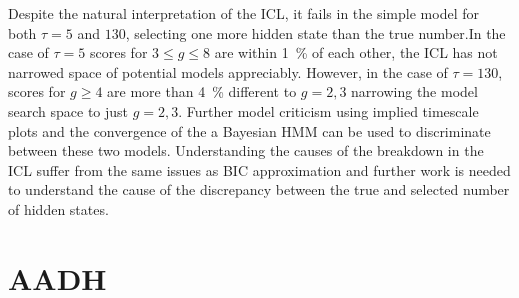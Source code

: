 Despite the natural interpretation of the ICL, it fails in the simple model for both $\tau=5$ and $130$, selecting one more hidden state than the true number.In the case of $\tau=5$  scores for $3\le g \le 8$ are within \SI{1}{\percent} of each other, the ICL has not narrowed space of potential models appreciably. However, in the case of $\tau =130$, scores for $g\ge 4$ are more than \SI{4}{\percent} different to $g=2, 3$ narrowing the model search space to just $g=2, 3$. Further model criticism using implied timescale plots and the convergence of the a Bayesian HMM can be used to discriminate between these two models. Understanding the causes of the breakdown in the ICL suffer from the same issues as BIC approximation and further work is needed to understand the cause of the discrepancy between the true and selected number of hidden states. 


\section{AADH}









